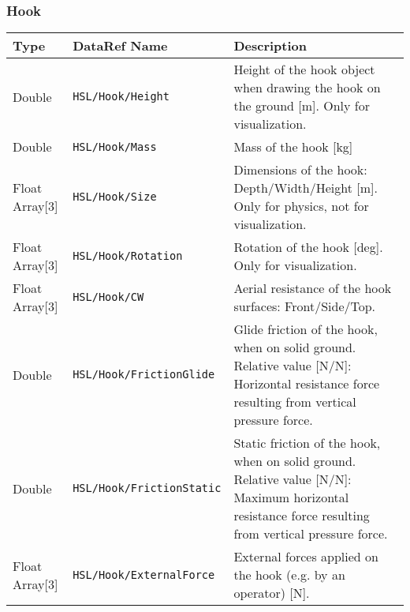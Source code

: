 \documentclass[10pt,a4]{scrartcl}
\begin{document}
\subsubsection{Hook}
\begin{tabularx}{\linewidth}{| l | l | X |} \hline
\textbf{Type} & \textbf{DataRef Name}& \textbf{Description}\\ \hline

Double & \texttt{HSL/Hook/Height} & Height of the hook object when drawing the hook on the ground [m]. Only for visualization.\\ \hline
Double & \texttt{HSL/Hook/Mass} & Mass of the hook [kg]\\ \hline
Float Array[3] & \texttt{HSL/Hook/Size} & Dimensions of the hook: Depth/Width/Height [m]. Only for physics, not for visualization.\\ \hline
Float Array[3] & \texttt{HSL/Hook/Rotation} & Rotation of the hook [deg]. Only for visualization.\\ \hline
Float Array[3] & \texttt{HSL/Hook/CW} & Aerial resistance of the hook surfaces: Front/Side/Top. \\ \hline
Double & \texttt{HSL/Hook/FrictionGlide} &  Glide friction of the hook, when on solid ground. Relative value [N/N]: Horizontal resistance force resulting from vertical pressure force.\\ \hline
Double & \texttt{HSL/Hook/FrictionStatic} & Static friction of the hook, when on solid ground. Relative value [N/N]: Maximum horizontal resistance force resulting from vertical pressure force.\\ \hline

Float Array[3] & \texttt{HSL/Hook/ExternalForce} & External forces applied on the hook (e.g. by an operator) [N].\\ \hline
\end{tabularx}
\end{document}
